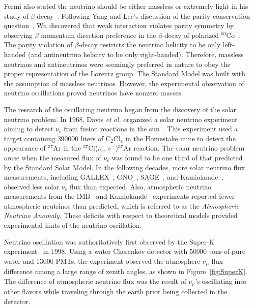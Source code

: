     Fermi also stated the neutrino should be either massless or extremely light in his study of $\beta$-decay~\cite{bib:Fermi}.
    Following Yang and Lee's discussion of the parity conservation question~\cite{bib:YangLee}, Wu discovered that weak interaction violates parity symmetry by observing $\beta$ momentum direction preference in the $\beta$-decay of polarized $^{60}$Co~\cite{bib:Wu}.
    The parity violation of $\beta$-decay restricts the neutrino helicity to be only left-handed (and antineutrino helicity to be only right-handed).
    Therefore, massless neutrinos and antineutrinos were seemingly preferred in nature to obey the proper representation of the Lorentz group.
    The Standard Model was built with the assumption of massless neutrinos.
    However, the experimental observation of neutrino oscillations proved neutrinos have nonzero masses.

    The research of the oscillating neutrino began from the discovery of the solar neutrino problem. 
    In 1968, Davis \textit{et al.} organized a solar neutrino experiment aiming to detect $\nu_e$ from fusion reactions in the sun~\cite{bib:davis}.
    This experiment used a target containing 390000 liters of C$_2$Cl$_4$ in the Homestake mine to detect the appearance of $^{37}$Ar in the $^{37}$Cl($\nu_e$, $e^-$)$^{37}$Ar reaction.
    The solar neutrino problem arose when the measured flux of $\nu_e$ was found to be one third of that predicted by the Standard Solar Model.
    In the following decades, more solar neutrino flux measurements, including GALLEX~\cite{bib:GALLEX}, GNO~\cite{bib:GNO}, SAGE~\cite{bib:SAGE}, and Kamiokande~\cite{bib:kamioka1996}, observed less solar $\nu_e$ flux than expected.
    Also, atmospheric neutrino measurements from the IMB~\cite{bib:IMB} and Kamiokande~\cite{bib:Kamioka1986} experiments reported fewer atmospheric neutrinos than predicted, which is referred to as the \textit{Atmospheric Neutrino Anomaly}.
    These deficits with respect to theoretical models provided experimental hints of the neutrino oscillation. 
    
    Neutrino oscillation was authoritatively first observed by the Super-K experiment~\cite{bib:SuperK} in 1998. 
    Using a water Cherenkov detector with 50000 tons of pure water and 13000 PMTs, the experiment observed the atmosphere $\nu_\mu$ flux difference among a large range of zenith angles, as shown in Figure~\ref{fig:SuperK}.
    The difference of atmospheric neutrino flux was the result of $\nu_\mu$'s oscillating into other flavors while traveling through the earth prior being collected in the detector.
    
